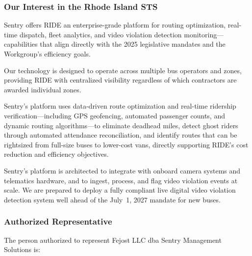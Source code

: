 \vspace{0.3cm}

\subsubsection*{Our Interest in the Rhode Island STS}

\begin{description}[style=nextline, leftmargin=1cm]
    \item[\textbf{Technology \& System Management:}] Sentry offers RIDE an enterprise-grade platform for routing optimization, real-time dispatch, fleet analytics, and video violation detection monitoring---capabilities that align directly with the 2025 legislative mandates and the Workgroup's efficiency goals.

    \item[\textbf{Vendor-Neutral Integration:}] Our technology is designed to operate across multiple bus operators and zones, providing RIDE with centralized visibility regardless of which contractors are awarded individual zones.

    \item[\textbf{Data-Driven Cost Reduction:}] Sentry's platform uses data-driven route optimization and real-time ridership verification---including GPS geofencing, automated passenger counts, and dynamic routing algorithms---to eliminate deadhead miles, detect ghost riders through automated attendance reconciliation, and identify routes that can be rightsized from full-size buses to lower-cost vans, directly supporting RIDE's cost reduction and efficiency objectives.

    \item[\textbf{Video Violation Detection Readiness:}] Sentry's platform is architected to integrate with onboard camera systems and telematics hardware, and to ingest, process, and flag video violation events at scale. We are prepared to deploy a fully compliant live digital video violation detection system well ahead of the July~1, 2027 mandate for new buses.
\end{description}

\vspace{0.3cm}

\subsubsection*{Authorized Representative}

The person authorized to represent Fejost LLC dba Sentry Management Solutions is:

